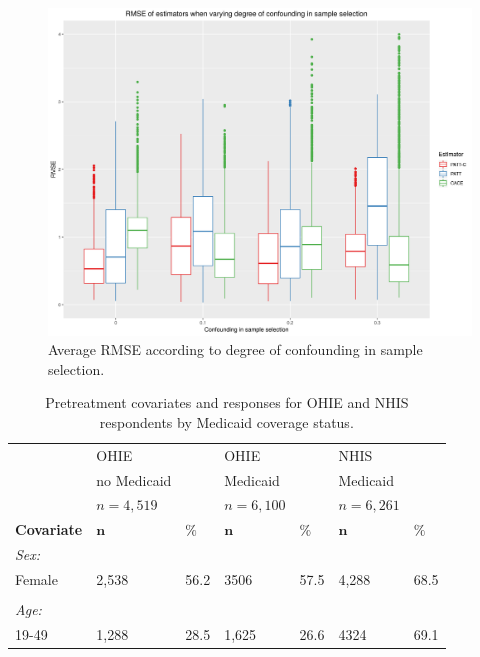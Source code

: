 \documentclass[hidelinks,12pt]{article}
\begin{document}
\begin{appendices}
\begin{figure}[htbp]
	\begin{center}
		\includegraphics[width = 1\textwidth]{rmse_boxplots_RateConS.png}
		\caption{Average RMSE according to degree of confounding in sample selection.\label{fig:rmse_boxplots_RateConS}}
	\end{center}
\end{figure}

\begin{singlespace}
	\begin{longtable}{lllllll}
		\caption{Pretreatment covariates and responses for OHIE and NHIS respondents by Medicaid coverage status.\label{rct-nrt-compare}} \\
		& OHIE &  & OHIE &  & NHIS &  \\ 
		& no Medicaid &  & Medicaid &  &Medicaid &   \\ 
		& $n=4,519$ &  & $n=6,100$ &  & $n=6,261$ &  \\  
		\hline   
		\hline   
		\textbf{Covariate} &  $\mathbf{n}$ & $\mathbf{\%}$ & $\mathbf{n}$ & $\mathbf{\%}$ & $\mathbf{n}$ & $\mathbf{\%}$ \\ 
		\hline
		\textit{Sex:} &  & & &  &  & \\ 
		
		\hspace{3mm} Female & 2,538 & 56.2 & 3506 & 57.5 & 4,288 & 68.5 \\ 
		&  & & &  &  & \\ 
		\textit{Age:} &  & & &  &  & \\ 
		\hspace{3mm}19-49 & 1,288 & 28.5 & 1,625 & 26.6 & 4324 & 69.1  \\ 
		

\end{longtable}
\end{singlespace}
\end{appendices}
\end{document}
